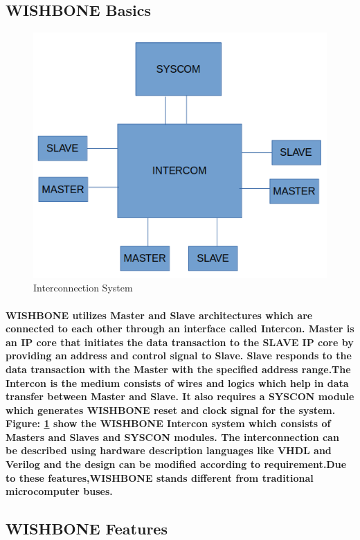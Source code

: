 \documentclass[12pt,a4paper]{report}
\begin{document}
\subsection{WISHBONE Basics }
\begin{figure}[h]
	\centering
	\includegraphics[scale=.6]{wb.png}
	\caption{Interconnection System}
	\label{fig:wb}
\end{figure}
\paragraph{\textrm{\textmd{WISHBONE utilizes Master and Slave architectures which are connected to each other through an interface called Intercon. Master is an IP core that initiates the
			data transaction to the SLAVE IP core by providing an address and control signal to Slave. Slave
			responds to the data transaction with the Master with the specified address range.The Intercon is the medium consists of wires and logics which help in data transfer
			between Master and Slave. It also requires a SYSCON module which generates WISHBONE reset and clock signal for the system.
			Figure: \ref{fig:wb} show the WISHBONE Intercon system which consists of Masters and Slaves and SYSCON modules. The interconnection can be
			described using hardware description languages like VHDL and Verilog and the design can be modified according to requirement.Due to these features,WISHBONE stands different from traditional microcomputer buses. }}}
\subsection{WISHBONE Features }
\end{document}
